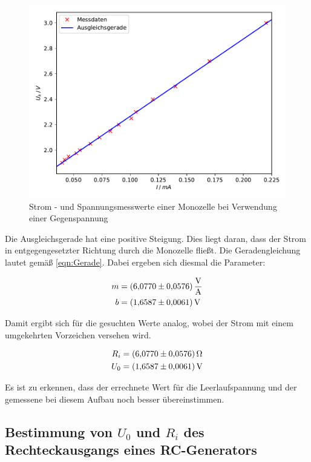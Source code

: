 \begin{figure}
  \centering
  \includegraphics[scale=0.75]{content/plot2.pdf}
  \caption{Strom - und Spannungsmesswerte einer Monozelle bei Verwendung einer Gegenspannung}
  \label{fig:plot2}
\end{figure}

Die Ausgleichsgerade hat eine positive Steigung. Dies liegt daran, dass 
der Strom in entgegengesetzter Richtung durch die Monozelle fließt. 
Die Geradengleichung lautet gemäß \ref{eqn:Gerade}. Dabei ergeben sich diesmal 
die Parameter: 

\begin{align*}
m &= \SI{6.0770+-0.0576}{\volt\per\ampere}\\
b &= \SI{1.6587+-0.0061}{\volt}
\end{align*}

Damit ergibt sich für die gesuchten Werte analog, wobei der Strom mit
einem umgekehrten Vorzeichen versehen wird. 

\begin{align*}
R_i &= \SI{6.0770+-0.0576}{\ohm}\\
U_0 &= \SI{1.6587+-0.0061}{\volt}
\end{align*}

Es ist zu erkennen, dass der errechnete Wert für die Leerlaufspannung
und der gemessene bei diesem Aufbau noch besser übereinstimmen.

\subsection{Bestimmung von $U_0$ und $R_i$ des Rechteckausgangs
            eines RC-Generators}

